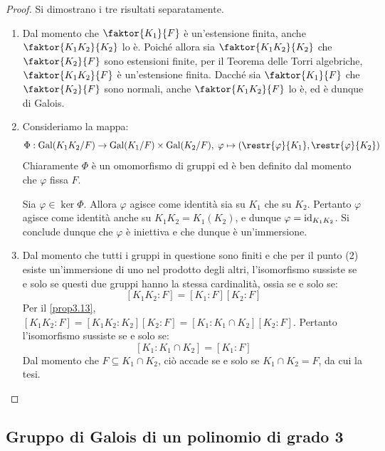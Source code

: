 \documentclass[11pt]{scrartcl}
\begin{document}
	\begin{proof}
		Si dimostrano i tre risultati separatamente.

		\begin{enumerate}[(1)]
			\item Dal momento che $\faktor{K_1}{F}$ è un'estensione finita,
			anche $\faktor{K_1 K_2}{K_2}$ lo è. Poiché allora sia $\faktor{K_1 K_2}{K_2}$
			che $\faktor{K_2}{F}$ sono estensioni finite, per il Teorema delle
			Torri algebriche, $\faktor{K_1 K_2}{F}$ è un'estensione finita. Dacché
			sia $\faktor{K_1}{F}$ che $\faktor{K_2}{F}$ sono normali, anche
			$\faktor{K_1 K_2}{F}$ lo è, ed è dunque di Galois.

			\item Consideriamo la mappa:
			\[ \Phi : \Gal(K_1 K_2 / F) \to \Gal(K_1 / F) \times \Gal(K_2 / F), \; \varphi \mapsto \left(\restr{\varphi}{K_1}, \restr{\varphi}{K_2}\right) \]
			Chiaramente $\Phi$ è un omomorfismo di gruppi ed è ben definito dal momento
			che $\varphi$ fissa $F$. \medskip


			Sia $\varphi \in \ker \Phi$. Allora $\varphi$ agisce come identità
			sia su $K_1$ che su $K_2$. Pertanto $\varphi$ agisce come identità
			anche su $K_1 K_2 = K_1(K_2)$, e dunque $\varphi = \mathrm{id}_{K_1 K_2}$.
			Si conclude dunque che $\varphi$ è iniettiva e che dunque è
			un'immersione. 

			\item Dal momento che tutti i gruppi in questione sono finiti e che
			per il punto (2) esiste un'immersione di uno nel prodotto degli altri,
			l'isomorfismo sussiste se e solo se questi due gruppi hanno la stessa
			cardinalità, ossia se e solo se:
			\[ [K_1 K_2 : F] = [K_1 : F] [K_2 : F] \]
			Per il \autoref{prop3.13}, $[K_1 K_2 : F] = [K_1 K_2 : K_2] [K_2 : F]
			= [K_1 : K_1 \cap K_2] [K_2 : F]$. Pertanto l'isomorfismo sussiste
			se e solo se:
			\[ [K_1 : K_1 \cap K_2] = [K_1 : F] \]
			Dal momento che $F \subseteq K_1 \cap K_2$, ciò accade se e solo se
			$K_1 \cap K_2 = F$, da cui la tesi.
		\end{enumerate}
	\end{proof}
	
	\newpage
	
	\subsection{Gruppo di Galois di un polinomio di grado 3}
	
\end{document}

